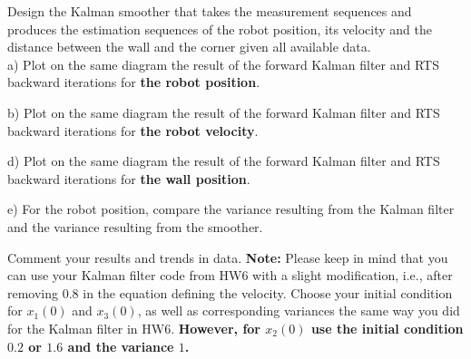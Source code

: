 \documentclass{article}
\begin{document}
Design the Kalman smoother that takes the measurement sequences and
produces the estimation sequences of the robot position, its velocity and the
distance between the wall and the corner given all available data. \\

a) Plot on the same diagram the result of the forward Kalman filter and
RTS backward iterations for {\bf the robot position}.

b) Plot on the same diagram the result of the forward Kalman filter and
RTS backward iterations for {\bf the robot velocity}.

d) Plot on the same diagram the result of the forward Kalman filter and
RTS backward iterations for {\bf the wall position}.

e) For the robot position, compare the variance resulting from the Kalman
filter and the variance resulting from the smoother.

Comment your results and trends in data. {\bf Note:} Please keep in mind that
you can use your Kalman filter code from HW6 with a slight modification, i.e.,
after removing 0.8 in the equation defining the velocity. Choose your initial
condition for $x_1(0)$ and $x_3(0)$, as well as corresponding variances the 
same way you did for the Kalman filter in HW6. {\bf However, for $x_2(0)$ use the 
initial condition $0.2$ or $1.6$ and the variance $1$.}
\end{document}
